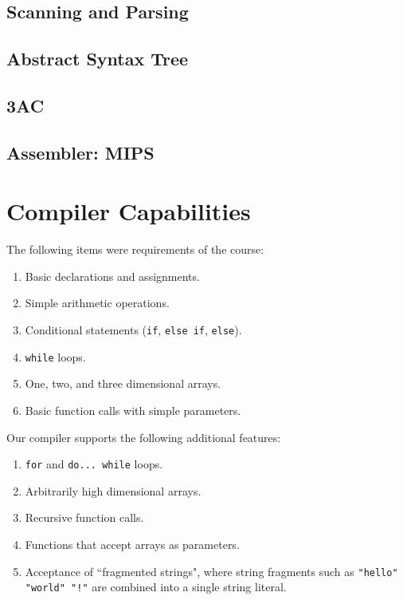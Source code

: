 \documentclass{article}
\begin{document}
\subsection{Scanning and Parsing}

\subsection{Abstract Syntax Tree}

\subsection{3AC}

\subsection{Assembler: MIPS}

\section{Compiler Capabilities}
The following items were requirements of the course:
  \begin{enumerate}
  \item Basic declarations and assignments.

  \item Simple arithmetic operations.

  \item Conditional statements (\texttt{if}, \texttt{else if}, \texttt{else}).

  \item \texttt{while} loops.

  \item One, two, and three dimensional arrays.

  \item Basic function calls with simple parameters.
  \end{enumerate}

Our compiler supports the following additional features:
  \begin{enumerate}
  \item \texttt{for} and \texttt{do... while} loops.

  \item Arbitrarily high dimensional arrays.

  \item Recursive function calls.

  \item Functions that accept arrays as parameters.

  \item Acceptance of ``fragmented strings", where string fragments such as
        \texttt{"hello" "world" "!"} are combined into a single string literal.
  \end{enumerate}
\end{document}
